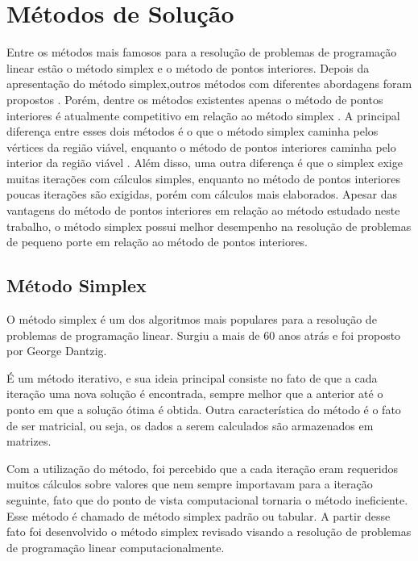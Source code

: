 \chapter{Métodos de Solução}
Entre os métodos mais famosos para a resolução de problemas de programação linear estão o método simplex  e o método de pontos interiores. 
Depois da apresentação do método simplex,outros métodos com diferentes abordagens foram propostos \cite{Todd}. Porém, dentre os métodos existentes apenas o método de pontos interiores é atualmente competitivo em relação ao método simplex . 
A principal diferença entre esses dois métodos é o que o método simplex caminha pelos vértices da região viável, enquanto o método de pontos interiores caminha pelo interior da região viável \cite{MaculanPI}. Além disso, uma outra diferença é que o simplex exige muitas iterações com cálculos simples, enquanto no método de pontos interiores poucas iterações são exigidas, porém com cálculos mais elaborados.
Apesar das vantagens do método de pontos interiores em relação ao método estudado neste trabalho, o método simplex possui melhor desempenho na resolução de problemas de pequeno porte em relação ao método de pontos interiores.

\section{Método Simplex}
O método simplex é um dos algoritmos mais populares para a resolução de problemas de programação linear. Surgiu a mais de 60 anos atrás e foi proposto por George Dantzig.  

É um método iterativo, e sua ideia principal consiste no fato de que a cada iteração uma nova solução é encontrada, sempre melhor que a anterior até o ponto em que a solução ótima é obtida. Outra característica do método é o fato de ser matricial, ou seja, os dados a serem calculados são armazenados em matrizes.  

Com a utilização do método, foi percebido que a cada iteração eram requeridos muitos cálculos sobre valores que nem sempre importavam para a iteração seguinte, fato que do ponto de vista computacional tornaria o método ineficiente. Esse método é chamado de método simplex padrão ou tabular. A partir desse fato foi desenvolvido o método simplex revisado visando a resolução de problemas de programação linear computacionalmente.

